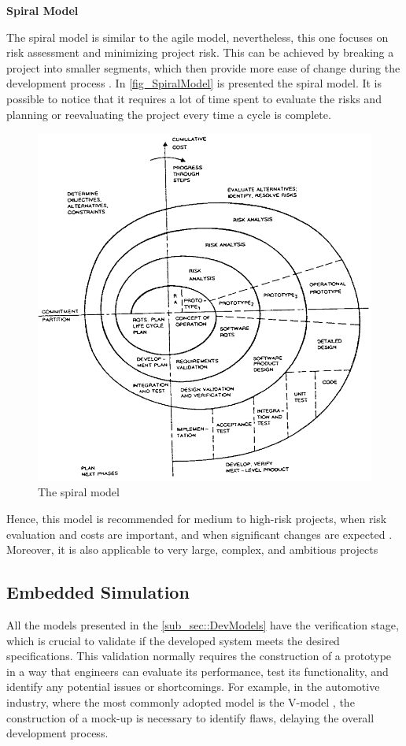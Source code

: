 \textbf{Spiral Model}
\newline

The spiral model is similar to the agile model, nevertheless, this one focuses on risk assessment and minimizing project risk. This can be 
achieved by breaking a project into smaller segments, which then provide more ease of change during the development process \cite{SpiralModel2}. 
In \autoref{fig_SpiralModel} is presented the spiral model. It is possible to notice that it requires a lot of time spent to evaluate the risks 
and planning or reevaluating the project every time a cycle is complete.

\begin{figure}[H]
	\centering
 	\includegraphics[width=0.5\linewidth]{Images/SpiralModel.png}
 	\caption{The spiral model \cite{SpiralModel3}}
	 \label{fig_SpiralModel}
\end{figure}

Hence, this model is recommended for medium to high-risk projects, when risk evaluation 
and costs are important, and when significant changes are expected \cite{SpiralModel2}. Moreover, it is also applicable to very large, complex, 
and ambitious projects \cite{SpiralModel3}


\subsection{Embedded Simulation}
\label{subSec::EmbeddedSim}

All the models presented in the \autoref{sub_sec::DevModels} have the verification stage, which is crucial to validate if the developed system 
meets the desired specifications. This validation normally requires the construction of a prototype in a way that engineers can evaluate its 
performance, test its functionality, and identify any potential issues or shortcomings. For example, in the automotive industry, where the most 
commonly adopted model is the V-model \cite{liu2016incremental}, the construction of a mock-up is necessary to identify flaws, delaying the 
overall development process. 

